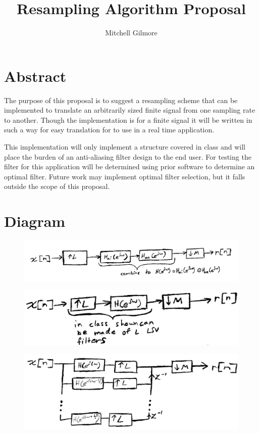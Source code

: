 \documentclass[letterpaper]{article}
\title{Resampling Algorithm Proposal}
\author{Mitchell Gilmore}
\begin{document}
	\maketitle

	\section*{Abstract}

	The purpose of this proposal is to suggest a resampling scheme that can be implemented to translate
	an arbitrarily sized finite signal from one sampling rate to another. Though the implementation
	is for a finite signal it will be written in such a way for easy translation for to use in a real
	time application. \newline

	\noindent
	This implementation will only implement a structure covered in class and will place the burden of an
	anti-aliasing filter design to the end user. For testing the filter for this application will be
	determined using prior software to determine an optimal filter. Future work may implement optimal
	filter selection, but it falls outside the scope of this proposal.

	\section*{Diagram}


	\begin{figure}[!ht]
		\centering
		\includegraphics[scale=0.2]{figs/main.png}
	\end{figure}

	\begin{figure}[H]
		\centering
		\includegraphics[scale=0.2]{figs/main2.png}
	\end{figure}

	\begin{figure}[H]
		\centering
		\includegraphics[scale=0.2]{figs/main3.png}
	\end{figure}
\end{document}
